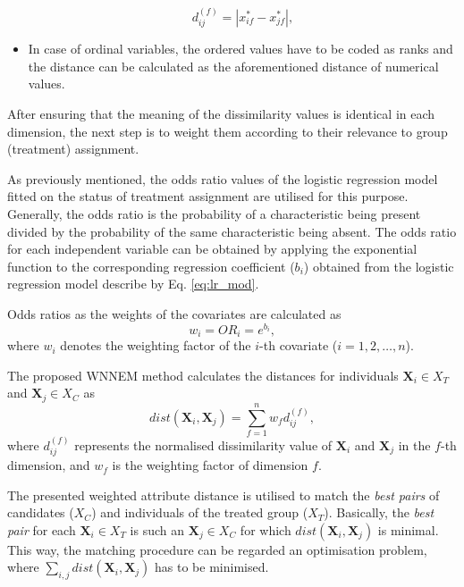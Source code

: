 \begin{itemize}
			      \begin{equation}
			      	\label{eq:dist_cont}
			      	d_{ij}^{(f)}=|x_{if}^*-x_{jf}^*|,
			      \end{equation}  
			\item In case of ordinal variables, the ordered values have to be coded as ranks and the distance can be calculated as the aforementioned distance of numerical values. 
		\end{itemize}
										
		After ensuring that the meaning of the dissimilarity values is identical in each dimension, the next step is to weight them according to their relevance to group (treatment) assignment.
										
		As previously mentioned, the odds ratio values of the logistic regression model fitted on the status of treatment assignment are utilised for this purpose. Generally, the odds ratio is the probability of a characteristic being present divided by the probability of the same characteristic being absent. The odds ratio for each independent variable can be obtained by applying the exponential function to the corresponding regression coefficient ($ b_i $) obtained from the logistic regression model describe by Eq. \ref{eq:lr_mod}.
										
		Odds ratios as the weights of the covariates are calculated as	
		\begin{equation}
			\label{eq:wi}
			w_i=OR_i=e^{b_i},
		\end{equation}
		where $w_i$ denotes the weighting factor of the $i$-th covariate ($i=1, 2, \dots, n$).
										
		The proposed WNNEM method calculates the distances for individuals $\textbf{X}_i \in X_T$ and $\textbf{X}_j \in X_C$ as			
		\begin{equation}
			\label{eq:weighteddissim}
			dist(\textbf{X}_i,\textbf{X}_j)=\sum_{f=1}^nw_fd^{(f)}_{ij},
		\end{equation}
		where $d^{(f)}_{ij}$ represents the normalised dissimilarity value of $\textbf{X}_i$ and $\textbf{X}_j$ in the $f$-th dimension, and $w_f$ is the weighting factor of dimension $f$.
										
		The presented weighted attribute distance is utilised to match the \textit{best pairs} of candidates ($X_C$) and individuals of the treated group ($X_T$). Basically, the \textit{best pair} for each $\textbf{X}_i \in X_T$ is such an $\textbf{X}_j \in X_C$ for which $dist(\textbf{X}_i,\textbf{X}_j)$ is minimal. This way, the matching procedure can be regarded an optimisation problem, where $\sum_{i,j} dist(\textbf{X}_i,\textbf{X}_j)$ has to be minimised.
										
